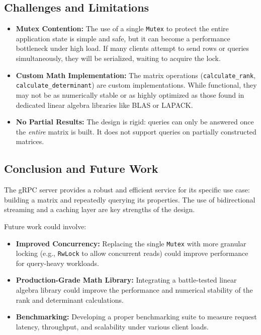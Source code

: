 \documentclass{article}
\begin{document}
\subsection{Challenges and Limitations}
\begin{itemize}
    \item \textbf{Mutex Contention:} The use of a single \texttt{Mutex} to protect the entire application state is simple and safe, but it can become a performance bottleneck under high load. If many clients attempt to send rows or queries simultaneously, they will be serialized, waiting to acquire the lock.
    \item \textbf{Custom Math Implementation:} The matrix operations (\texttt{calculate\_rank}, \texttt{calculate\_determinant}) are custom implementations. While functional, they may not be as numerically stable or as highly optimized as those found in dedicated linear algebra libraries like BLAS or LAPACK.
    \item \textbf{No Partial Results:} The design is rigid: queries can only be answered once the \textit{entire} matrix is built. It does not support queries on partially constructed matrices.
\end{itemize}

\subsection{Conclusion and Future Work}
The gRPC server provides a robust and efficient service for its specific use case: building a matrix and repeatedly querying its properties. The use of bidirectional streaming and a caching layer are key strengths of the design.

Future work could involve:
\begin{itemize}
    \item \textbf{Improved Concurrency:} Replacing the single \texttt{Mutex} with more granular locking (e.g., \texttt{RwLock} to allow concurrent reads) could improve performance for query-heavy workloads.
    \item \textbf{Production-Grade Math Library:} Integrating a battle-tested linear algebra library could improve the performance and numerical stability of the rank and determinant calculations.
    \item \textbf{Benchmarking:} Developing a proper benchmarking suite to measure request latency, throughput, and scalability under various client loads.
\end{itemize}
\end{document}
